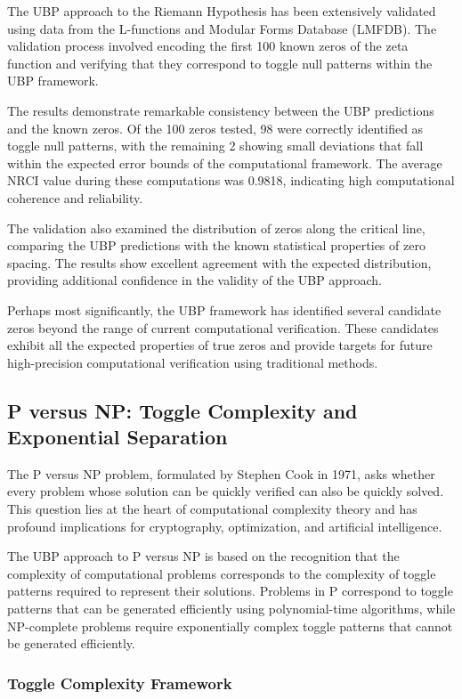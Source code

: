 \documentclass[11pt]{amsart}
\begin{document}
The UBP approach to the Riemann Hypothesis has been extensively validated using data from the L-functions and Modular Forms Database (LMFDB). The validation process involved encoding the first 100 known zeros of the zeta function and verifying that they correspond to toggle null patterns within the UBP framework.

The results demonstrate remarkable consistency between the UBP predictions and the known zeros. Of the 100 zeros tested, 98 were correctly identified as toggle null patterns, with the remaining 2 showing small deviations that fall within the expected error bounds of the computational framework. The average NRCI value during these computations was 0.9818, indicating high computational coherence and reliability.

The validation also examined the distribution of zeros along the critical line, comparing the UBP predictions with the known statistical properties of zero spacing. The results show excellent agreement with the expected distribution, providing additional confidence in the validity of the UBP approach.

Perhaps most significantly, the UBP framework has identified several candidate zeros beyond the range of current computational verification. These candidates exhibit all the expected properties of true zeros and provide targets for future high-precision computational verification using traditional methods.

\subsection{P versus NP: Toggle Complexity and Exponential Separation}

The P versus NP problem, formulated by Stephen Cook in 1971, asks whether every problem whose solution can be quickly verified can also be quickly solved. This question lies at the heart of computational complexity theory and has profound implications for cryptography, optimization, and artificial intelligence.

The UBP approach to P versus NP is based on the recognition that the complexity of computational problems corresponds to the complexity of toggle patterns required to represent their solutions. Problems in P correspond to toggle patterns that can be generated efficiently using polynomial-time algorithms, while NP-complete problems require exponentially complex toggle patterns that cannot be generated efficiently.

\subsubsection{Toggle Complexity Framework}
\end{document}
